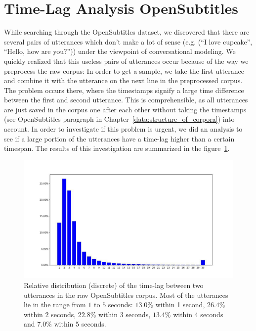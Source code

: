 \section{Time-Lag Analysis OpenSubtitles}
\label{data:opensubtitles:time_lag_analysis}
While searching through the OpenSubtitles dataset, we discovered that there are several pairs of utterances which don't make a lot of sense (e.g. (``I love cupcake'', ``Hello, how are you?'')) under the viewpoint of conversational modeling. We quickly realized that this useless pairs of utterances occur because of the way we preprocess the raw corpus: In order to get a sample, we take the first utterance and combine it with the utterance on the next line in the preprocessed corpus. The problem occurs there, where the timestamps signify a large time difference between the first and second utterance. This is comprehensible, as all utterances are just saved in the corpus one after each other without taking the timestamps (see OpenSubtitles paragraph in Chapter~\ref{data:structure_of_corpora}) into account. In order to investigate if this problem is urgent, we did an analysis to see if a large portion of the utterances have a time-lag higher than a certain timespan. The results of this investigation are summarized in the figure~\ref{fig:data:analyse:timediff:opus}.

\begin{figure}[H]
	\centering
	\includegraphics[width=15cm]{img/opus_time_analyze.PNG}
	\caption{Relative distribution (discrete) of the time-lag between two utterances in the raw OpenSubtitles corpus. Most of the utterances lie in the range from $1$ to $5$ seconds: $13.0\%$ within 1 second, $26.4\%$ within 2 seconds, $22.8\%$ within 3 seconds, $13.4\%$ within 4 seconds and  $7.0\%$ within 5 seconds.}
	\label{fig:data:analyse:timediff:opus}
\end{figure}

